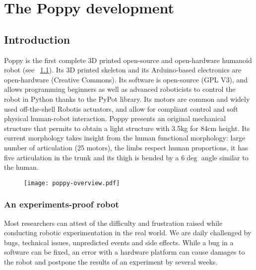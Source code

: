 
\cleartoleftpage

\chapter{The Poppy development} %


\section{Introduction} %

Poppy is the first complete 3D printed open-source and open-hardware humanoid robot (see \figurename~\ref{fig:poppyv0.1_overview}). Its 3D printed skeleton and its Arduino-based electronics are open-hardware (Creative Commons). Its software is open-source (GPL V3), and allows programming beginners as well as advanced roboticists to control the robot in Python thanks to the PyPot library. Its motors are common and widely used off-the-shell Robotis actuators, and allow for compliant control and soft physical human-robot interaction. Poppy presents an original mechanical structure that permits to obtain a light structure with 3.5kg for 84cm height.
Its current morphology takes insight from the human functional morphology: large number of articulation (25 motors), the limbs respect human proportions, it has five articulation in the trunk and its thigh is bended by a $6\deg$ angle similar to the human.

\begin{figure}[tb]
    \begin{center}
        \texttt{[image: poppy-overview.pdf]}
    \end{center}
    \caption{}
    \label{fig:poppyv0.1_overview}
\end{figure}

\subsection{An experiments-proof robot} %

Most researchers can attest of the difficulty and frustration raised while conducting robotic experimentation in the real world. We are daily challenged by bugs, technical issues, unpredicted events and side effects. While a bug in a software can be fixed, an error with a hardware platform can cause damages to the robot and postpone the results of an experiment by several weeks.

